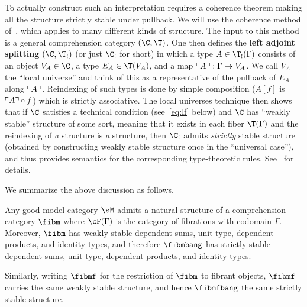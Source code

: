 To actually construct such an interpretation requires a coherence theorem making all the structure strictly stable under pullback.
We will use the coherence method of~\cite{lw:localuniv}, which applies to many different kinds of structure.
The input to this method is a general comprehension category $(\C,\T)$.
One then defines the \textbf{left adjoint splitting} $(\C,\T_!)$ (or just $\C_!$ for short) in which a type $A\in \T_!(\Gamma)$ consists of an object $V_A\in\C$, a type $E_A\in\T(V_A)$, and a map $\ulcorner A\urcorner:\Gamma\to V_A$.
We call $V_A$ the ``local universe'' and think of this as a representative of the pullback of $E_A$ along $\ulcorner A\urcorner$.
Reindexing of such types is done by simple composition ($A[f]$ is $\ulcorner A\urcorner\circ f$) which is strictly associative.
The local universes technique then shows that if $\C$ satisfies a technical condition (see~\eqref{eq:lf} below) and $\C$ has ``weakly stable'' structure of some sort, meaning that it exists in each fiber $\T(\Gamma)$ and the reindexing of \emph{a} structure is \emph{a} structure, then $\C_!$ admits \emph{strictly} stable structure (obtained by constructing weakly stable structure once in the ``universal case''), and thus provides semantics for the corresponding type-theoretic rules.
See~\cite{lw:localuniv} for details.

We summarize the above discussion as follows.

\begin{thm}\label{thm:gmc-tt}
  Any good model category $\sM$ admits a natural structure of a comprehension category $\fibm$ where $\cF(\Gamma)$ is the category of fibrations with codomain $\Gamma$.
  Moreover, $\fibm$ has weakly stable dependent sums, unit type, dependent products, and identity types, and therefore $\fibmbang$ has strictly stable dependent sums, unit type, dependent products, and identity types.

  Similarly, writing $\fibmf$ for the restriction of $\fibm$ to fibrant objects, $\fibmf$ carries the same weakly stable structure, and hence $\fibmfbang$ the same strictly stable structure.
\end{thm}



